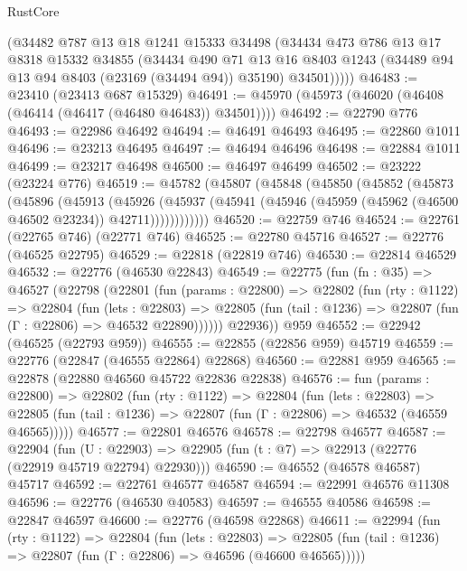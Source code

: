 \begin{lexlean}{RustCore}
\begin{coremodule}
        (@34482
          @787
          @13
          @18
          @1241
          @15333
          @34498
          (@34434
            @473
            @786
            @13
            @17
            @8318
            @15332
            @34855
            (@34434
              @490
              @71
              @13
              @16
              @8403
              @1243
              (@34489 @94 @13 @94 @8403 (@23169 (@34494 @94)) @35190)
              @34501)))))
@46483 := @23410 (@23413 @687 @15329)
@46491 := @45970 (@45973 (@46020 (@46408 (@46414 (@46417 (@46480 @46483)) @34501))))
@46492 := @22790 @776
@46493 := @22986 @46492
@46494 := @46491 @46493
@46495 := @22860 @1011
@46496 := @23213 @46495
@46497 := @46494 @46496
@46498 := @22884 @1011
@46499 := @23217 @46498
@46500 := @46497 @46499
@46502 := @23222 (@23224 @776)
@46519 := @45782
    (@45807
      (@45848
        (@45850
          (@45852
            (@45873
              (@45896
                (@45913
                  (@45926
                    (@45937
                      (@45941 (@45946 (@45959 (@45962 (@46500 @46502 @23234)) @42711))))))))))))
@46520 := @22759 @746
@46524 := @22761 (@22765 @746) (@22771 @746)
@46525 := @22780 @45716
@46527 := @22776 (@46525 @22795)
@46529 := @22818 (@22819 @746)
@46530 := @22814 @46529
@46532 := @22776 (@46530 @22843)
@46549 := @22775
    (fun (fn : @35) =>
    @46527
      (@22798
        (@22801
          (fun (params : @22800) =>
          @22802
            (fun (rty : @1122) =>
            @22804
              (fun (lets : @22803) =>
              @22805 (fun (tail : @1236) => @22807 (fun (Γ : @22806) => @46532 @22890))))))
        @22936))
    @959
@46552 := @22942 (@46525 (@22793 @959))
@46555 := @22855 (@22856 @959) @45719
@46559 := @22776 (@22847 (@46555 @22864) @22868)
@46560 := @22881 @959
@46565 := @22878 (@22880 @46560 @45722 @22836 @22838)
@46576 := fun (params : @22800) =>
  @22802
    (fun (rty : @1122) =>
    @22804
      (fun (lets : @22803) =>
      @22805 (fun (tail : @1236) => @22807 (fun (Γ : @22806) => @46532 (@46559 @46565)))))
@46577 := @22801 @46576
@46578 := @22798 @46577
@46587 := @22904
    (fun (U : @22903) => @22905 (fun (t : @7) => @22913 (@22776 (@22919 @45719 @22794) @22930)))
@46590 := @46552 (@46578 @46587) @45717
@46592 := @22761 @46577 @46587
@46594 := @22991 @46576 @11308
@46596 := @22776 (@46530 @40583)
@46597 := @46555 @40586
@46598 := @22847 @46597
@46600 := @22776 (@46598 @22868)
@46611 := @22994
    (fun (rty : @1122) =>
    @22804
      (fun (lets : @22803) =>
      @22805 (fun (tail : @1236) => @22807 (fun (Γ : @22806) => @46596 (@46600 @46565)))))

\end{coremodule}
\end{lexlean}
